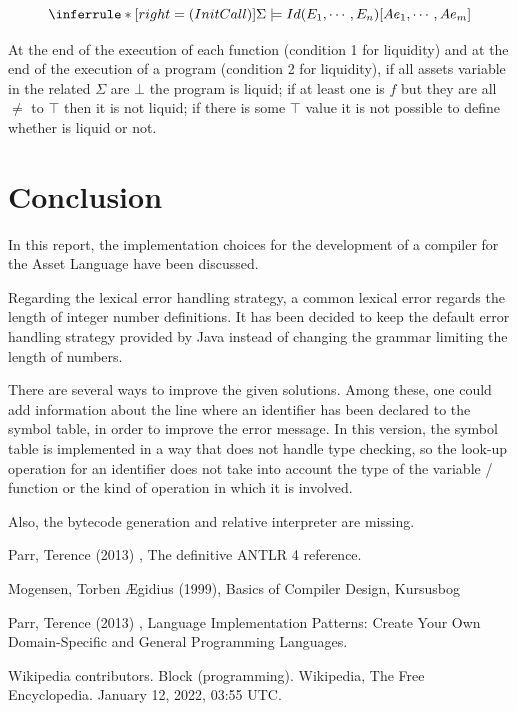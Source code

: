 \documentclass[11pt]{article} %
\begin{document}
\medskip

\[
\inferrule*[right=(InitCall)]
{\\}
{\Sigma \models Id(E_1,\cdots,E_n)[Ae_1,\cdots,Ae_m]}
\]


\medskip

At the end of the execution of each function (condition 1 for liquidity) and at the end of the execution of a program (condition 2 for liquidity), if all assets variable in the related $\Sigma$ are $\bot$ the program is liquid; if at least one is $f$ but they are all $\neq$ to $\top$ then it is not liquid; if there is some $\top$ value it is not possible to define whether is liquid or not.

\section{Conclusion}
In this report, the implementation choices for the development of a compiler for the Asset Language have been discussed.

\medskip

Regarding the lexical error handling strategy, a common lexical error regards the length of integer number definitions. It has been decided to keep the default error handling strategy provided by Java instead of changing the grammar limiting the length of numbers.

\medskip

There are several ways to improve the given solutions. Among these, one could add information about the line where an identifier has been declared to the symbol table, in order to improve the error message. In this version, the symbol table is implemented in a way that does not handle type checking, so the look-up operation for an identifier does not take into account the type of the variable / function or the kind of operation in which it is involved.

\medskip

Also, the bytecode generation and relative interpreter are missing.

\clearpage

\begin{thebibliography}{9}
Parr, Terence (2013) , The definitive ANTLR 4 reference.

Mogensen, {Torben {\AE}gidius} (1999), Basics of Compiler Design, Kursusbog 

Parr, Terence (2013) , Language Implementation Patterns: Create Your Own Domain-Specific and General Programming Languages.

Wikipedia contributors. Block (programming). Wikipedia, The Free Encyclopedia. January 12, 2022, 03:55 UTC. 
\end{thebibliography}
\end{document}
